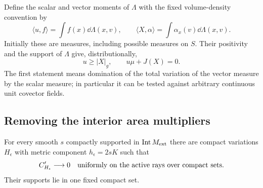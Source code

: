 Define the scalar and vector moments of $\Lambda$ with the fixed
volume-density convention by
\begin{equation}
 \langle u,f\rangle=\int f(x)\dd\Lambda(x,v),\qquad
 \langle X,\alpha\rangle=\int\alpha_x(v)\dd\Lambda(x,v).
 \label{n3:variation:moments}
\end{equation}
Initially these are measures, including possible measures on $S$.
Their positivity and the support of $\Lambda$ give, distributionally,
\begin{equation}
 u\ge |X|_g,\qquad u\mu+J(X)=0.
 \label{n3:variation:measure-complementarity}
\end{equation}
The first statement means domination of the total variation of the
vector measure by the scalar measure; in particular it can be tested
against arbitrary continuous unit covector fields.

\subsection{Removing the interior area multipliers}
\label{n3:variation:normal-slice-subsection}

\begin{lemma}
\label{n3:variation:normal-tests}
For every smooth $s$ compactly supported in
$\operatorname{Int}M_{\mathrm{ext}}$ there are compact variations $H_\epsilon$
with metric component $h_\epsilon=2sK$ such that
\begin{equation}
 C'_{H_\epsilon}\longrightarrow0
 \quad\hbox{uniformly on the active rays over compact sets}.
 \label{n3:variation:normal-test-limit}
\end{equation}
Their supports lie in one fixed compact set.
\end{lemma}

